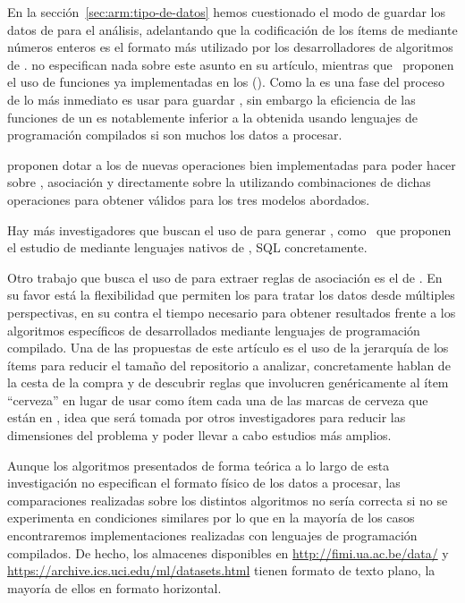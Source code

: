 En la sección~\ref{sec:arm:tipo-de-datos} hemos cuestionado el modo de guardar los datos de \D para el análisis, adelantando que la codificación de los ítems de \I mediante números enteros es el formato más utilizado por los desarrolladores de algoritmos de \ARM. \citet{AgrawalImielinskiSwami-MiningAssociationRulesBetweenSetsOfItemsInLargeDB-1993} no especifican nada sobre este asunto en su artículo, mientras que~\citet{HoutsmaSwami-SETMofAR-1993} proponen el uso de funciones ya implementadas en los \dbmss (\DBMS). Como la \arm es una fase del proceso de \KDD lo más inmediato es usar \dbs para guardar \D, sin embargo la eficiencia de las funciones de un \DBMS es notablemente inferior a la obtenida usando lenguajes de programación compilados si son muchos los datos a procesar.

\citet{AgrawalImielinskiSwami-DatabaseMiningAPerformancePerspective-1993} proponen dotar a los \DBMS de nuevas operaciones bien implementadas para poder hacer \dm sobre \clasificacion, {asociación} y \secuencias directamente sobre la \DB utilizando combinaciones de dichas operaciones para obtener \patrones válidos para los tres modelos abordados.

Hay más investigadores que buscan el uso de \DBMS para generar \ARs, como~\citet{HoutsmaSwami-SetOrientedMiningForAR-1995} que proponen el estudio de \ARM mediante lenguajes nativos de \dbs, SQL concretamente.

Otro trabajo que busca el uso de \DBMS para extraer reglas de asociación es el de \citet{HolsheimerKerstenMannilaToivonen-APerspectiveOnDatabasesAndDataMining-1995}. En su favor está la flexibilidad que permiten los \DBMS para tratar los datos desde múltiples perspectivas, en su contra el tiempo necesario para obtener resultados frente a los algoritmos específicos de \ARM desarrollados mediante lenguajes de programación compilado. Una de las propuestas de este artículo es el uso de la jerarquía de los ítems para reducir el tamaño del repositorio a analizar, concretamente hablan de la cesta de la compra y de descubrir reglas que involucren genéricamente al ítem "`cerveza"' en lugar de usar como ítem cada una de las marcas de cerveza que están en \I, idea que será tomada por otros investigadores para reducir las dimensiones del problema y poder llevar a cabo estudios más amplios.

Aunque los algoritmos presentados de forma teórica a lo largo de esta investigación no especifican el formato físico de los datos a procesar, las comparaciones realizadas sobre los distintos algoritmos no sería correcta si no se experimenta en condiciones similares por lo que en la mayoría de los casos encontraremos implementaciones realizadas con lenguajes de programación compilados. De hecho, los almacenes \D disponibles en \url{http://fimi.ua.ac.be/data/} y \url{https://archive.ics.uci.edu/ml/datasets.html} tienen formato de texto plano, la mayoría de ellos en formato horizontal.